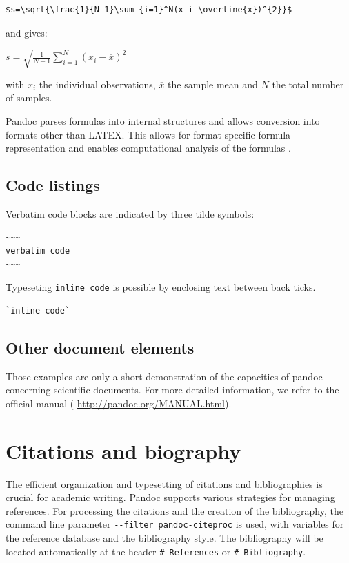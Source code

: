 \documentclass[10pt,fleqn]{wlpeerj}
\begin{document}
\begin{verbatim}
$s=\sqrt{\frac{1}{N-1}\sum_{i=1}^N(x_i-\overline{x})^{2}}$
\end{verbatim}

and
gives:

\(s=\sqrt{\frac{1}{N-1}\sum_{i=1}^N(x_i-\overline{x})^{2}}\)

with
\(x_i\)
the
individual
observations,
\(\overline{x}\)
the
sample
mean
and
\(N\)
the
total
number
of
samples.

Pandoc
parses
formulas
into
internal
structures
and
allows
conversion
into
formats
other
than
LATEX.
This
allows
for
format-specific
formula
representation
and
enables
computational
analysis
of
the
formulas
\citep{garnet_semiautomatic_2015}.

\subsection{Code
listings}\label{code-listings}

Verbatim
code
blocks
are
indicated
by
three
tilde
symbols:

\begin{verbatim}
~~~
verbatim code
~~~
\end{verbatim}

Typeseting
\texttt{inline\ code}
is
possible
by
enclosing
text
between
back
ticks.

\begin{verbatim}
`inline code`
\end{verbatim}

\subsection{Other
document
elements}\label{other-document-elements}

Those
examples
are
only
a
short
demonstration
of
the
capacities
of
pandoc
concerning
scientific
documents.
For
more
detailed
information,
we
refer
to
the
official
manual
(
\url{http://pandoc.org/MANUAL.html}).

\section{Citations
and
biography}\label{citations-and-biography}

The
efficient
organization
and
typesetting
of
citations
and
bibliographies
is
crucial
for
academic
writing.
Pandoc
supports
various
strategies
for
managing
references.
For
processing
the
citations
and
the
creation
of
the
bibliography,
the
command
line
parameter
\texttt{-\/-filter\ pandoc-citeproc}
is
used,
with
variables
for
the
reference
database
and
the
bibliography
style.
The
bibliography
will
be
located
automatically
at
the
header
\texttt{\#\ References}
or
\texttt{\#\ Bibliography}.
\end{document}
